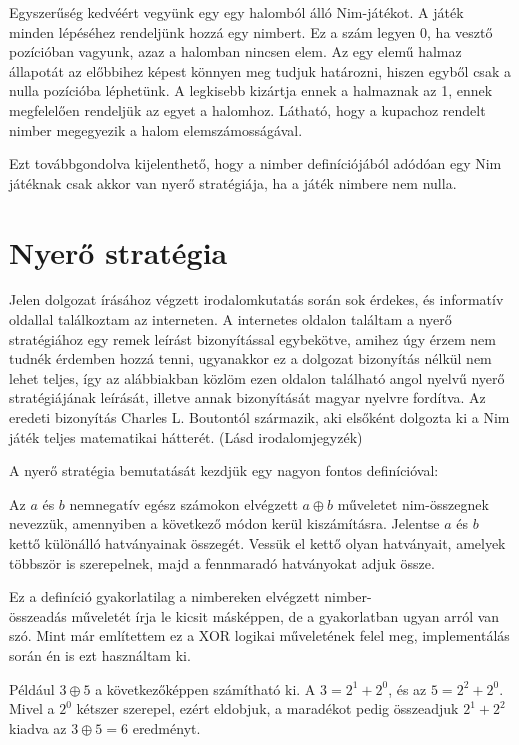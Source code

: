 Egyszerűség kedvéért vegyünk egy egy halomból álló Nim-játékot. A játék minden lépéséhez rendeljünk hozzá egy nimbert. Ez a szám legyen 0, ha vesztő pozícióban vagyunk, azaz a halomban nincsen elem. Az egy elemű halmaz állapotát az előbbihez képest könnyen meg tudjuk határozni, hiszen egyből csak a nulla pozícióba léphetünk. A legkisebb kizártja ennek a halmaznak az 1, ennek megfelelően rendeljük az egyet a halomhoz. Látható, hogy a kupachoz rendelt nimber megegyezik a halom elemszámosságával. \ujsor

Ezt továbbgondolva kijelenthető, hogy a nimber definíciójából adódóan egy Nim játéknak csak akkor van nyerő stratégiája, ha a játék nimbere nem nulla.


\section{Nyerő stratégia}
Jelen dolgozat írásához végzett irodalomkutatás során sok érdekes, és informatív oldallal találkoztam az interneten. A \cite{bibref:brilliant_nim} internetes oldalon találtam a nyerő stratégiához egy remek leírást bizonyítással egybekötve, amihez úgy érzem nem tudnék érdemben hozzá tenni, ugyanakkor ez a dolgozat bizonyítás nélkül nem lehet teljes, így az alábbiakban közlöm ezen oldalon található angol nyelvű nyerő stratégiájának leírását, illetve annak bizonyítását magyar nyelvre fordítva. Az eredeti bizonyítás Charles L. Boutontól származik, aki elsőként dolgozta ki a Nim játék teljes matematikai hátterét. (Lásd irodalomjegyzék) \ujsor

A nyerő stratégia bemutatását kezdjük egy nagyon fontos definícióval:
\begin{definition}
	Az $a$ és $b$ nemnegatív egész számokon elvégzett $a \oplus b$ műveletet nim-összegnek nevezzük, amennyiben a következő módon kerül kiszámításra. Jelentse $a$ és $b$ kettő különálló hatványainak összegét. Vessük el kettő olyan hatványait, amelyek többször is szerepelnek, majd a fennmaradó hatványokat adjuk össze.
\end{definition}

\begin{remark}
	Ez a definíció gyakorlatilag a nimbereken elvégzett nimber-\\összeadás műveletét írja le kicsit másképpen, de a gyakorlatban ugyan arról van szó. Mint már említettem ez a XOR logikai műveletének felel meg, implementálás során én is ezt használtam ki.
\end{remark}

Például $3 \oplus 5$ a következőképpen számítható ki. A $3 = 2^1 + 2^0$, és az $5 = 2^2 + 2^0$. Mivel a $2^0$ kétszer szerepel, ezért eldobjuk, a maradékot pedig  összeadjuk $2^1 + 2^2$ kiadva az $3 \oplus 5 = 6$ eredményt. \ujsor

